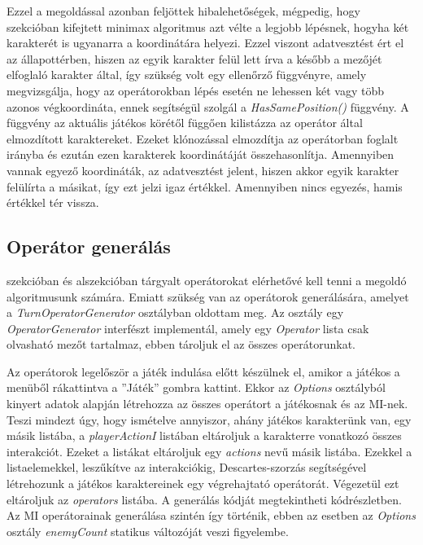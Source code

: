 \documentclass[
]{thesis-ekf}
\theoremstyle{definition}
\theoremstyle{remark}
\begin{document}
Ezzel a megoldással azonban feljöttek hibalehetőségek, mégpedig, hogy  szekcióban kifejtett minimax algoritmus azt vélte a legjobb lépésnek, hogyha két karakterét is ugyanarra a koordinátára helyezi. Ezzel viszont adatvesztést ért el az állapottérben, hiszen az egyik karakter felül lett írva a később a mezőjét elfoglaló karakter által, így szükség volt egy ellenőrző függvényre, amely megvizsgálja, hogy az operátorokban lépés esetén ne lehessen két vagy több azonos végkoordináta, ennek segítségül szolgál a \emph{HasSamePosition()} függvény. A függvény az aktuális játékos körétől függően kilistázza az operátor által elmozdított karaktereket. Ezeket klónozással elmozdítja az operátorban foglalt irányba és ezután ezen karakterek koordinátáját összehasonlítja. Amennyiben vannak egyező koordináták, az adatvesztést jelent, hiszen akkor egyik karakter felülírta a másikat, így ezt jelzi igaz értékkel. Amennyiben nincs egyezés, hamis értékkel tér vissza.

\subsection{Operátor generálás} \label{operatorgen}

 szekcióban és  alszekcióban tárgyalt operátorokat elérhetővé kell tenni a megoldó algoritmusunk számára. Emiatt szükség van az operátorok generálására, amelyet a \emph{TurnOperatorGenerator} osztályban oldottam meg. Az osztály egy \emph{OperatorGenerator} interfészt implementál, amely egy \emph{Operator} lista csak olvasható mezőt tartalmaz, ebben tároljuk el az összes operátorunkat.

Az operátorok legelőször a játék indulása előtt készülnek el, amikor a játékos a menüből rákattintva a ''Játék'' gombra kattint. Ekkor az \emph{Options} osztályból kinyert adatok alapján létrehozza az összes operátort a játékosnak és az MI-nek. Teszi mindezt úgy, hogy ismételve annyiszor, ahány játékos karakterünk van, egy másik listába, a \emph{playerActionI} listában eltároljuk a karakterre vonatkozó összes interakciót. Ezeket a listákat eltároljuk egy \emph{actions} nevű másik listába. Ezekkel a listaelemekkel, leszűkítve az interakciókig, Descartes-szorzás segítségével létrehozunk a játékos karaktereinek egy végrehajtató operátorát. Végezetül ezt eltároljuk az \emph{operators} listába. A generálás kódját megtekintheti  kódrészletben. Az MI operátorainak generálása szintén így történik, ebben az esetben az \emph{Options} osztály \emph{enemyCount} statikus változóját veszi figyelembe.
\end{document}
